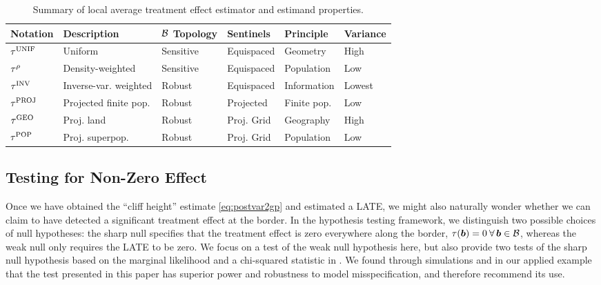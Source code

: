 \begin{table}[tbp]
    \centering
    \bgroup
    \def\arraystretch{1.1}%
    \begin{tabular}{llllll}
        \hline
        Notation   & Description           & \(\mathcal{B}\) Topology & Sentinels & Principle & Variance \\
        \hline
        \(\tau^{\mathrm{UNIF}}\) & Uniform               & Sensitive & Equispaced      & Geometry    & High     \\
        \(\tau^{\rho}\)  & Density-weighted      & Sensitive & Equispaced      & Population  & Low      \\
        \(\tau^{\mathrm{INV}}\)  & Inverse-var. weighted & Robust    & Equispaced      & Information & Lowest   \\
        \(\tau^{\mathrm{PROJ}}\) & Projected finite pop. & Robust    & Projected       & Finite pop. & Low      \\
        \(\tau^{\mathrm{GEO}}\)  & Proj. land            & Robust    & Proj. Grid  & Geography   & High     \\
        \(\tau^{\mathrm{POP}}\)  & Proj. superpop.       & Robust    & Proj. Grid  & Population  & Low \\
        \hline
    \end{tabular}
    \egroup
    \caption{
    \label{table:estimator_properties}
    Summary of local average treatment effect estimator and estimand properties.}
\end{table}

\subsection{Testing for Non-Zero Effect}
\label{sec:hypothesis_testing}
Once we have obtained the ``cliff height'' estimate \autoref{eq:postvar2gp} and estimated a LATE, we might also naturally wonder whether we can claim to have detected a significant treatment effect at the border.
In the hypothesis testing framework, we distinguish two possible choices of null hypotheses:
the sharp null specifies that the treatment effect is zero everywhere along the border,
\(\tau(\bm{b})=0\:\forall\,\bm{b} \in \mathcal{B}\), 
whereas the weak null only requires the LATE to be zero.
We focus on a test of the weak null hypothesis here, but also provide two tests of the sharp null hypothesis based on the marginal likelihood and a chi-squared statistic in \ofsupp{}.
We found through simulations and in our applied example that the test presented in this paper has superior power and robustness to model misspecification, and therefore recommend its use.

